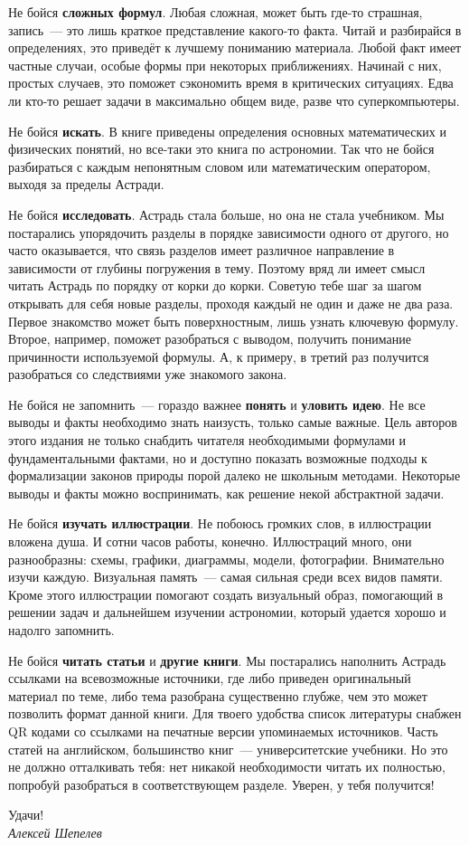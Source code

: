 Не бойся \textbf{сложных формул}. Любая сложная, может быть где-то страшная, запись~--- это лишь краткое представление какого-то факта. Читай и разбирайся в определениях, это приведёт к лучшему пониманию материала. Любой факт имеет частные случаи, особые формы при некоторых приближениях. Начинай с них, простых случаев, это поможет сэкономить время в критических ситуациях. Едва ли кто-то решает задачи в максимально общем виде, разве что суперкомпьютеры.

Не бойся \textbf{искать}. В книге приведены определения основных математических и физических понятий, но все-таки это книга по астрономии. Так что не бойся разбираться с каждым непонятным словом или математическим оператором, выходя за пределы Астради.

Не бойся \textbf{исследовать}. Астрадь стала больше, но она не стала учебником. Мы постарались упорядочить разделы в порядке зависимости одного от другого, но часто оказывается, что связь разделов имеет различное направление в зависимости от глубины погружения в тему. Поэтому вряд ли имеет смысл читать Астрадь по порядку от корки до корки. Советую тебе шаг за шагом открывать для себя новые разделы, проходя каждый не один и даже не два раза. Первое знакомство может быть поверхностным, лишь узнать ключевую формулу. Второе, например, поможет разобраться с выводом, получить понимание причинности используемой формулы. А, к примеру, в третий раз получится разобраться со следствиями уже знакомого закона.

Не бойся не запомнить~--- гораздо важнее \textbf{понять} и \textbf{уловить идею}. Не все выводы и факты необходимо знать наизусть, только самые важные.  Цель авторов этого издания не только снабдить читателя необходимыми формулами и фундаментальными фактами, но и доступно показать возможные подходы к формализации законов природы порой далеко не школьным методами. Некоторые выводы и факты можно воспринимать, как решение некой абстрактной задачи.

Не бойся \textbf{изучать иллюстрации}. Не побоюсь громких слов, в иллюстрации вложена душа. И сотни часов работы, конечно. Иллюстраций много, они разнообразны: схемы, графики, диаграммы, модели, фотографии. Внимательно изучи каждую. Визуальная память~--- самая сильная среди всех видов памяти. Кроме этого иллюстрации помогают создать визуальный образ, помогающий в решении задач и дальнейшем изучении астрономии, который удается хорошо и надолго запомнить.

Не бойся \textbf{читать статьи} и \textbf{другие книги}. Мы постарались наполнить Астрадь ссылками на всевозможные источники, где либо приведен оригинальный материал по теме, либо тема разобрана существенно глубже, чем это может позволить формат данной книги. Для твоего удобства список литературы снабжен QR кодами со ссылками на печатные версии упоминаемых источников. Часть статей на английском, большинство книг~--- университетские учебники. Но это не должно отталкивать тебя: нет никакой необходимости читать их полностью, попробуй разобраться в соответствующем разделе. Уверен, у тебя получится!

\begin{flushright}
    Удачи!\\
    \it Алексей Шепелев
\end{flushright}
